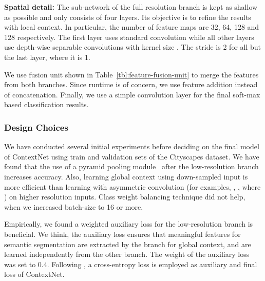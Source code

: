 \documentclass[runningheads]{llncs}
\newcommand{\subsubsubsection}[1]{\vspace{0.2em}\noindent\textbf{\textcolor[rgb]{0,.1,.4}{#1:}}}
\begin{document}
\subsubsubsection{Spatial detail} The sub-network of the full resolution branch is kept as shallow as possible and only consists of four layers. Its objective is to refine the results with local context. In particular, the number of feature maps are 32, 64, 128 and 128 respectively. The first layer uses standard convolution while all other layers use depth-wise separable convolutions with kernel size . The stride is 2 for all but the last layer, where it is 1.

\begin{table}[t]
\begin{center}
\end{center}
\caption{Features fusion unit of ContextNet.}
\label{tbl:feature-fusion-unit}
\end{table}
We use fusion unit shown in Table~\ref{tbl:feature-fusion-unit} to merge the features from both branches. Since runtime is of concern, we use feature addition instead of concatenation. Finally, we use a simple  convolution layer for the final soft-max based classification results.

\subsubsection{Design Choices}
We have conducted several initial experiments before deciding on the final model of ContextNet using train and validation sets of the Cityscapes dataset. We have found that the use of a pyramid pooling module~\cite{zhao2017a} after the low-resolution branch increases accuracy. Also, learning global context using down-sampled input is more efficient than learning with asymmetric convolution (for examples, , , where ) on higher resolution inputs. Class weight balancing technique did not help, when we increased batch-size to 16 or more.

Empirically, we found a weighted auxiliary loss for the low-resolution branch is beneficial. We think, the auxiliary loss ensures that meaningful features for semantic segmentation are extracted by the branch for global context, and are learned independently from the other branch. The weight of the auxiliary loss was set to 0.4. Following \cite{chen2016,zhao2017a}, a cross-entropy loss is employed as auxiliary and final loss of ContextNet.
\end{document}
